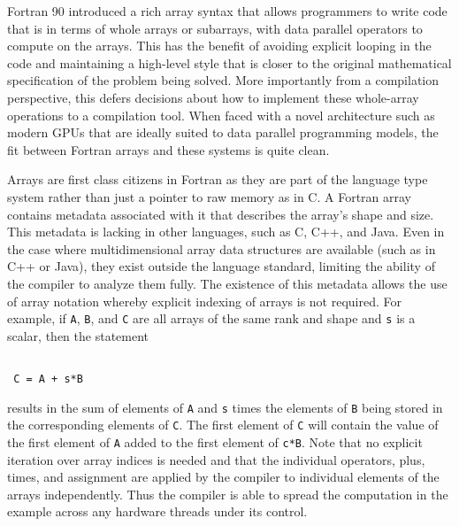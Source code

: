\documentclass[10pt, conference, compsocconf]{IEEEtran}
\begin{document}
Fortran 90 introduced a rich array syntax that allows programmers to
write code that is in terms of whole arrays or subarrays, with data
parallel operators to compute on the arrays.  This has the benefit of
avoiding explicit looping in the code and maintaining a high-level
style that is closer to the original mathematical specification of the
problem being solved.  More importantly from a compilation
perspective, this defers decisions about how to implement these
whole-array operations to a compilation tool.  When faced with a novel
architecture such as modern GPUs that are ideally suited to data parallel
programming models, the fit between Fortran arrays and these systems is
quite clean.

Arrays are first class citizens in Fortran as they are part of the language
type system rather than just a pointer to raw memory as in C. A Fortran array
contains metadata associated with it that describes the array's shape and
size. This metadata is lacking in other languages, such as C, C++, and Java.
Even in the case where multidimensional array data structures are available
(such as in C++ or Java), they exist outside the language standard, limiting
the ability of the compiler to analyze them fully. The existence of this
metadata allows the use of array notation whereby explicit indexing of arrays
is not required. For example, if {\tt A}, {\tt B}, and {\tt C} are all arrays
of the same rank and shape and {\tt s} is a scalar, then the statement

\begin{verbatim}

 C = A + s*B

\end{verbatim}

results in the sum of elements of {\tt A} and {\tt s} times the elements of
{\tt B} being stored in the corresponding elements of {\tt C}. The first
element of {\tt C} will contain the value of the first element of {\tt A}
added to the first element of {\tt c*B}.  Note that no explicit iteration over
array indices is needed and that the individual operators, plus, times, and
assignment are applied by the compiler to individual elements of the arrays
independently.  Thus the compiler is able to spread the computation in the
example across any hardware threads under its control.

\end{document}
